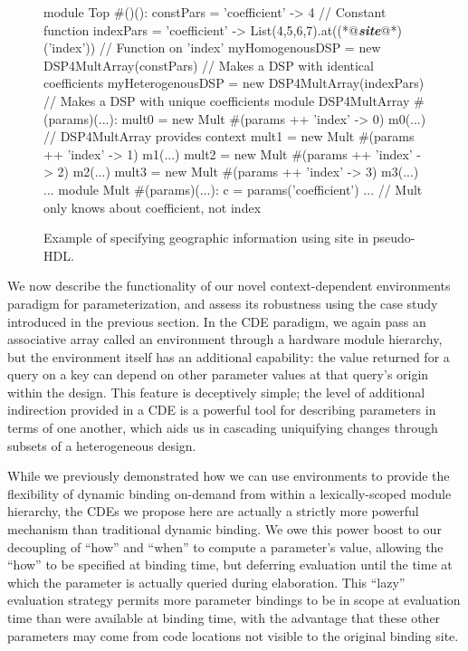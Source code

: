 \begin{figure}
\centering
\begin{phdl}
module Top #()():
  constPars = { 'coefficient' -> 4 }                               // Constant function
  indexPars = { 'coefficient' -> List(4,5,6,7).at((*@\textcolor[rgb]{1,0.5,0}{\textbf{\textit{site}}}@*)('index')) } // Function on 'index'
  myHomogenousDSP   = new DSP4MultArray(constPars)     // Makes a DSP with identical coefficients
  myHeterogenousDSP = new DSP4MultArray(indexPars)     // Makes a DSP with unique coefficients
module DSP4MultArray #(params)(...):
  mult0 = new Mult #(params ++ {'index' -> 0}) m0(...) // DSP4MultArray provides context
  mult1 = new Mult #(params ++ {'index' -> 1}) m1(...)
  mult2 = new Mult #(params ++ {'index' -> 2}) m2(...)
  mult3 = new Mult #(params ++ {'index' -> 3}) m3(...) ...
module Mult #(params)(...):
  c = params('coefficient') ...                        // Mult only knows about coefficient, not index
\end{phdl}
\caption{Example of specifying geographic information using site in pseudo-HDL.}
\label{fig:site-phdl}
\end{figure}

We now describe the functionality of our novel context-dependent environments paradigm for parameterization,
and assess its robustness using the case study introduced in the previous section.
In the CDE paradigm, we again pass an associative array called an environment through a hardware module hierarchy, but the environment itself has an additional capability:
the value returned for a query on a key can depend on other parameter values at that query's origin within the design.
This feature is deceptively simple; the level of additional indirection provided in a CDE is a powerful tool for describing
parameters in terms of one another, which aids us in cascading uniquifying changes through subsets of a heterogeneous design.

While we previously demonstrated how we can use environments to provide the flexibility of dynamic binding on-demand from within a lexically-scoped module hierarchy, 
the CDEs we propose here are actually a strictly more powerful mechanism than traditional dynamic binding. 
We owe this power boost to our decoupling of ``how'' and ``when'' to compute a parameter's value,
allowing the ``how'' to be specified at binding time,
but deferring evaluation until the time at which the parameter is actually queried during elaboration.
This ``lazy'' evaluation strategy permits more parameter bindings to be in scope at
evaluation time than were available at binding time,
with the advantage that these other parameters may come from code locations not visible to the original binding site.

